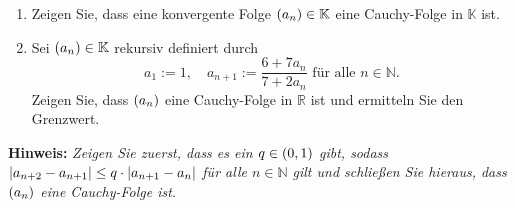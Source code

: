 \documentclass[german,12pt]{homework}
\newcommand{\NN}{\mathbb{N}}
\newcommand{\RR}{\mathbb{R}}
\newcommand{\KK}{\mathbb{K}}
\DeclarePairedDelimiter{\absolute}{\lvert}{\rvert}
\DeclarePairedDelimiter{\enbrace}{(}{)}
\begin{document}
    \begin{problem}
        \begin{enumerate}
            \item Zeigen Sie, dass eine konvergente Folge \(\enbrace*{a_n} \in \KK\) eine Cauchy-Folge in \(\KK\) ist.
            \item Sei \(\enbrace*{a_n} \in \KK\) rekursiv definiert durch
            \[a_1 := 1, \quad a_{n + 1} := \frac{6 + 7a_n}{7 + 2a_n}\text{ für alle }n \in \NN.\]
            Zeigen Sie, dass \(\enbrace*{a_n}\) eine Cauchy-Folge in \(\RR\) ist und ermitteln Sie den Grenzwert.
        \end{enumerate}
        \textbf{Hinweis:} \quad \emph{Zeigen Sie zuerst, dass es ein \(q \in \enbrace*{0, 1}\) gibt, sodass \(\absolute*{a_{n + 2} - a_{n + 1}} \le q \cdot \absolute*{a_{n + 1} - a_n}\) für alle \(n \in \NN\) gilt und schließen Sie hieraus, dass \(\enbrace*{a_n}\) eine Cauchy-Folge ist.}
    \end{problem}
\end{document}
